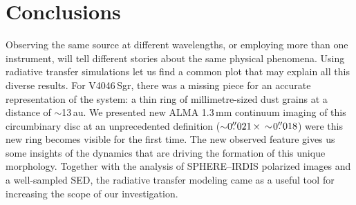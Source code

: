 \documentclass[fleqn,usenatbib,useAMS]{mnras}
\begin{document}
\section{Conclusions} \label{sec:Conclusions}

Observing the same source at different wavelengths, or employing more than one instrument, will tell different stories about the same physical phenomena. Using radiative transfer simulations let us find a common plot that may explain all this diverse results. For V4046\,Sgr, there was a missing piece for an accurate representation of the system: a thin ring of millimetre-sized dust grains at a distance of $\sim$13\,au. We presented new ALMA 1.3\,mm continuum imaging of this circumbinary disc at an unprecedented definition ($\sim$0$\hbox{$.\!\!^{\prime\prime}$}021 \, \times \, \sim$0$\hbox{$.\!\!^{\prime\prime}$}018$) were this new ring becomes visible for the first time. The new observed feature gives us some insights of the dynamics that are driving the formation of this unique morphology. Together with the analysis of SPHERE--IRDIS polarized images and a well-sampled SED, the radiative transfer modeling came as a useful tool for increasing the scope of our investigation.
\end{document}
